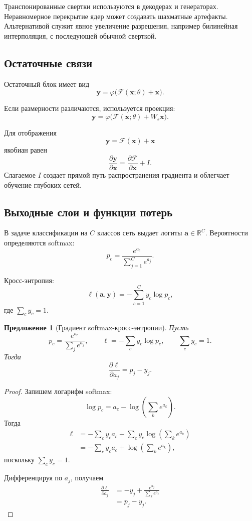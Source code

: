 \documentclass[12pt,a4paper]{article}
\newcommand{\R}{\mathbb{R}}
\numberwithin{equation}{section}
\newtheorem{proposition}[theorem]{Предложение}
\theoremstyle{definition}
\theoremstyle{remark}
\begin{document}
Транспонированные свертки используются в декодерах и генераторах.
Неравномерное перекрытие ядер может создавать шахматные артефакты.
Альтернативой служит явное увеличение разрешения, например
билинейная интерполяция, с последующей обычной сверткой.

\subsection{Остаточные связи}

Остаточный блок имеет вид
\[
    \bm{y}
    =
    \varphi\bigl(\mathcal{F}(\bm{x};\theta)+\bm{x}\bigr).
\]

Если размерности различаются, используется проекция:
\[
    \bm{y}
    =
    \varphi\bigl(
        \mathcal{F}(\bm{x};\theta)
        +
        W_s\bm{x}
    \bigr).
\]

Для отображения
\[
    \bm{y}=\mathcal{F}(\bm{x})+\bm{x}
\]
якобиан равен
\[
    \frac{\partial\bm{y}}{\partial\bm{x}}
    =
    \frac{\partial\mathcal{F}}{\partial\bm{x}}+I.
\]
Слагаемое \(I\) создает прямой путь распространения градиента и
облегчает обучение глубоких сетей.

\subsection{Выходные слои и функции потерь}

В задаче классификации на \(C\) классов сеть выдает логиты
\(\bm{a}\in\R^C\). Вероятности определяются softmax:
\[
    p_c
    =
    \frac{e^{a_c}}{\sum_{j=1}^{C}e^{a_j}}.
\]

Кросс-энтропия:
\[
    \ell(\bm{a},\bm{y})
    =
    -\sum_{c=1}^{C}y_c\log p_c,
\]
где \(\sum_c y_c=1\).

\begin{proposition}[Градиент softmax-кросс-энтропии]
Пусть
\[
    p_c=\frac{e^{a_c}}{\sum_j e^{a_j}},
    \qquad
    \ell=-\sum_c y_c\log p_c,
    \qquad
    \sum_c y_c=1.
\]
Тогда
\[
    \frac{\partial\ell}{\partial a_j}
    =
    p_j-y_j.
\]
\end{proposition}

\begin{proof}
Запишем логарифм softmax:
\[
    \log p_c
    =
    a_c-\log\left(\sum_k e^{a_k}\right).
\]
Тогда
\[
\begin{split}
    \ell
    &=
    -\sum_c y_c a_c
    +
    \sum_c y_c
    \log\left(\sum_k e^{a_k}\right)\\
    &=
    -\sum_c y_c a_c
    +
    \log\left(\sum_k e^{a_k}\right),
\end{split}
\]
поскольку \(\sum_c y_c=1\).

Дифференцируя по \(a_j\), получаем
\[
\begin{split}
    \frac{\partial\ell}{\partial a_j}
    &=
    -y_j
    +
    \frac{e^{a_j}}{\sum_k e^{a_k}}\\
    &=
    p_j-y_j.
\end{split}
\]
\end{proof}
\end{document}
